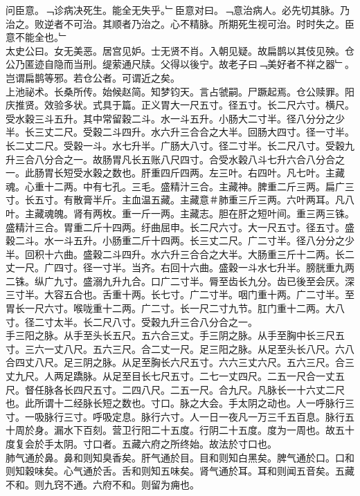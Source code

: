 \documentclass{zhvt-classic}
\begin{document}
\hspace*{2em}问臣意。﹁诊病决死生。能全无失乎。﹂臣意对曰。﹁意治病人。必先切其脉。乃治之。败逆者不可治。其顺者乃治之。心不精脉。所期死生视可治。时时失之。臣意不能全也。﹂\\
\hspace*{2em}太史公曰。女无美恶。居宫见妒。士无贤不肖。入朝见疑。故扁鹊以其伎见殃。仓公乃匿迹自隐而当刑。缇萦通尺牍。父得以後宁。故老子曰﹁美好者不祥之器﹂。岂谓扁鹊等邪。若仓公者。可谓近之矣。\\
\hspace*{2em}上池祕术。长桑所传。始候赵简。知梦钧天。言占虢嗣。尸蹶起焉。仓公赎罪。阳庆推贤。效验多状。式具于篇。正义胃大一尺五寸。径五寸。长二尺六寸。横尺。受水穀三斗五升。其中常留穀二斗。水一斗五升。小肠大二寸半。径八分分之少半。长三丈二尺。受穀二斗四升。水六升三合合之大半。回肠大四寸。径一寸半。长二丈二尺。受穀一斗。水七升半。广肠大八寸。径二寸半。长二尺八寸。受穀九升三合八分合之一。故肠胃凡长五账八尺四寸。合受水穀八斗七升六合八分合之一。此肠胃长短受水穀之数也。肝重四斤四两。左三叶。右四叶。凡七叶。主藏魂。心重十二两。中有七孔。三毛。盛精汁三合。主藏神。脾重二斤三两。扁广三寸。长五寸。有散膏半斤。主血温五藏。主藏意＃肺重三斤三两。六叶两耳。凡八叶。主藏魂魄。肾有两枚。重一斤一两。主藏志。胆在肝之短叶间。重三两三铢。盛精汁三合。胃重二斤十四两。纡曲屈申。长二尺六寸。大一尺五寸。径五寸。盛穀二斗。水一斗五升。小肠重二斤十四两。长三丈二尺。广二寸半。径八分分之少半。回积十六曲。盛穀二斗四升。水六升三合合之大半。大肠重三斤十二两。长二丈一尺。广四寸。径一寸半。当齐。右回十六曲。盛穀一斗水七升半。膀胱重九两二铢。纵广九寸。盛溺九升九合。口广二寸半。脣至齿长九分。齿已後至会厌。深三寸半。大容五合也。舌重十两。长七寸。广二寸半。咽门重十两。广二寸半。至胃长一尺六寸。喉咙重十二两。广二寸。长一尺二寸九节。肛门重十二两。大八寸。径二寸太半。长二尺八寸。受穀九升三合八分合之一。\\
\hspace*{2em}手三阳之脉。从手至头长五尺。五六合三丈。手三阴之脉。从手至胸中长三尺五寸。三六一丈八尺。五六三尺。合二丈一尺。足三阳之脉。从足至头长八尺。六八合四丈八尺。足三阴之脉。从足至胸长六尺五寸。六六三丈六尺。五六三尺。合三丈九尺。人两足蹻脉。从足至目长七尺五寸。二七一丈四尺。二五一尺合一丈五尺。督任脉各长四尺五寸。二四八尺。二五一尺。合九尺。凡脉长一十六丈二尺也。此所谓十二经脉长短之数也。寸口。脉之大会。手太阴之动也。人一呼脉行三寸。一吸脉行三寸。呼吸定息。脉行六寸。人一日一夜凡一万三千五百息。脉行五十周於身。漏水下百刻。营卫行阳二十五度。行阴二十五度。度为一周也。故五十度复会於手太阴。寸口者。五藏六府之所终始。故法於寸口也。\\
\hspace*{2em}肺气通於鼻。鼻和则知臭香矣。肝气通於目。目和则知白黑矣。脾气通於口。口和则知穀味矣。心气通於舌。舌和则知五味矣。肾气通於耳。耳和则闻五音矣。五藏不和。则九窍不通。六府不和。则留为痈也。\\
\end{document}
